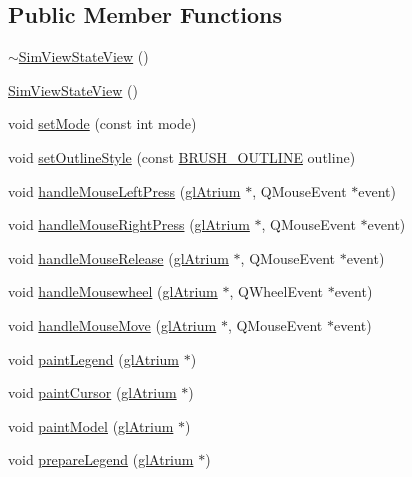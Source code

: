 \subsection*{Public Member Functions}
\begin{DoxyCompactItemize}
\item 
\hyperlink{class_sim_view_state_view_a53ee7dbb7b57ff9a11157530f724fc6c}{$\sim$\+Sim\+View\+State\+View} ()
\item 
\hyperlink{class_sim_view_state_view_a50285d334c6fc2a919819098123d553b}{Sim\+View\+State\+View} ()
\item 
void \hyperlink{class_sim_view_state_view_a71335c51c957210f1bd6f697026c2de1}{set\+Mode} (const int mode)
\item 
void \hyperlink{class_sim_view_state_view_a478f837eea498f64d56bac73856b1112}{set\+Outline\+Style} (const \hyperlink{_sim_view_state_8h_a64cb6e33858a4b9db209712bab2f0e99}{B\+R\+U\+S\+H\+\_\+\+O\+U\+T\+L\+I\+N\+E} outline)
\item 
void \hyperlink{class_sim_view_state_view_af59efbe30926804b1e344a6d072e8a56}{handle\+Mouse\+Left\+Press} (\hyperlink{classgl_atrium}{gl\+Atrium} $\ast$, Q\+Mouse\+Event $\ast$event)
\item 
void \hyperlink{class_sim_view_state_view_af9c7bbc4803aa9c735642bfd55621185}{handle\+Mouse\+Right\+Press} (\hyperlink{classgl_atrium}{gl\+Atrium} $\ast$, Q\+Mouse\+Event $\ast$event)
\item 
void \hyperlink{class_sim_view_state_view_a744509eb2f2183839db2314f4b8e355b}{handle\+Mouse\+Release} (\hyperlink{classgl_atrium}{gl\+Atrium} $\ast$, Q\+Mouse\+Event $\ast$event)
\item 
void \hyperlink{class_sim_view_state_view_acf5a37a09255f9bade04d734eeca23b2}{handle\+Mousewheel} (\hyperlink{classgl_atrium}{gl\+Atrium} $\ast$, Q\+Wheel\+Event $\ast$event)
\item 
void \hyperlink{class_sim_view_state_view_a57b794dd5b5a13f26be4763976052ec5}{handle\+Mouse\+Move} (\hyperlink{classgl_atrium}{gl\+Atrium} $\ast$, Q\+Mouse\+Event $\ast$event)
\item 
void \hyperlink{class_sim_view_state_view_a35f2631db7cf7f2299461a5042d5b5ff}{paint\+Legend} (\hyperlink{classgl_atrium}{gl\+Atrium} $\ast$)
\item 
void \hyperlink{class_sim_view_state_view_af77472deee1b96ae0bbbe6f7e8e8e341}{paint\+Cursor} (\hyperlink{classgl_atrium}{gl\+Atrium} $\ast$)
\item 
void \hyperlink{class_sim_view_state_view_ac8c1e5d3136a8b14276a6c8b6a03065f}{paint\+Model} (\hyperlink{classgl_atrium}{gl\+Atrium} $\ast$)
\item 
void \hyperlink{class_sim_view_state_view_adb26e11e9aa29c2c72e9b013d35c3c8f}{prepare\+Legend} (\hyperlink{classgl_atrium}{gl\+Atrium} $\ast$)
\end{DoxyCompactItemize}
